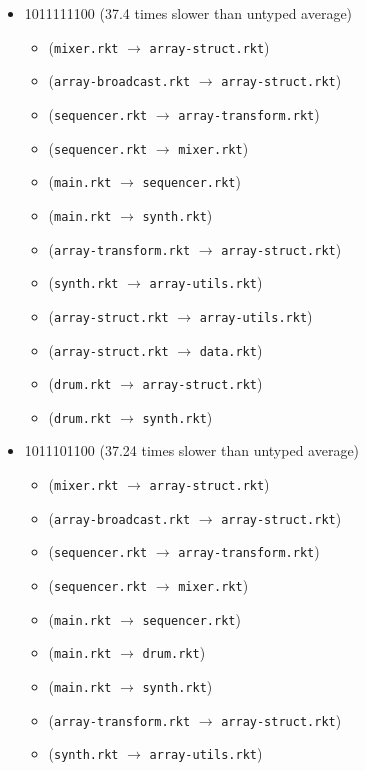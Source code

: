 \documentclass{article}
\newcommand{\mono}[1]{\texttt{#1}}
\begin{document}
\begin{itemize}
\begin{itemize}
  \end{itemize}
\item 1011111100 (37.4 times slower than untyped average)
  \begin{itemize}
  \item (\mono{mixer.rkt} $\rightarrow$ \mono{array-struct.rkt})
  \item (\mono{array-broadcast.rkt} $\rightarrow$ \mono{array-struct.rkt})
  \item (\mono{sequencer.rkt} $\rightarrow$ \mono{array-transform.rkt})
  \item (\mono{sequencer.rkt} $\rightarrow$ \mono{mixer.rkt})
  \item (\mono{main.rkt} $\rightarrow$ \mono{sequencer.rkt})
  \item (\mono{main.rkt} $\rightarrow$ \mono{synth.rkt})
  \item (\mono{array-transform.rkt} $\rightarrow$ \mono{array-struct.rkt})
  \item (\mono{synth.rkt} $\rightarrow$ \mono{array-utils.rkt})
  \item (\mono{array-struct.rkt} $\rightarrow$ \mono{array-utils.rkt})
  \item (\mono{array-struct.rkt} $\rightarrow$ \mono{data.rkt})
  \item (\mono{drum.rkt} $\rightarrow$ \mono{array-struct.rkt})
  \item (\mono{drum.rkt} $\rightarrow$ \mono{synth.rkt})
  \end{itemize}
\item 1011101100 (37.24 times slower than untyped average)
  \begin{itemize}
  \item (\mono{mixer.rkt} $\rightarrow$ \mono{array-struct.rkt})
  \item (\mono{array-broadcast.rkt} $\rightarrow$ \mono{array-struct.rkt})
  \item (\mono{sequencer.rkt} $\rightarrow$ \mono{array-transform.rkt})
  \item (\mono{sequencer.rkt} $\rightarrow$ \mono{mixer.rkt})
  \item (\mono{main.rkt} $\rightarrow$ \mono{sequencer.rkt})
  \item (\mono{main.rkt} $\rightarrow$ \mono{drum.rkt})
  \item (\mono{main.rkt} $\rightarrow$ \mono{synth.rkt})
  \item (\mono{array-transform.rkt} $\rightarrow$ \mono{array-struct.rkt})
  \item (\mono{synth.rkt} $\rightarrow$ \mono{array-utils.rkt})

\end{itemize}
\end{itemize}
\end{document}
